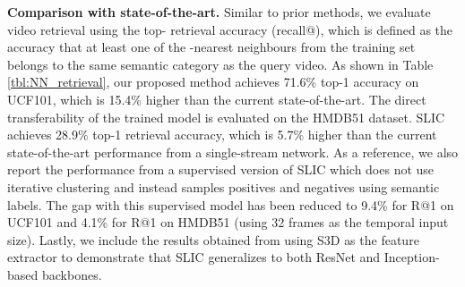 \documentclass[10pt,twocolumn,letterpaper]{article}
\begin{document}
\textbf{Comparison with state-of-the-art.} Similar to prior methods, we evaluate video retrieval using the top- retrieval accuracy (recall@), which is defined as the accuracy that at least one of the -nearest neighbours from the training set belongs to the same semantic category as the query video. As shown in Table \ref{tbl:NN_retrieval}, our proposed method achieves 71.6\% top-1 accuracy on UCF101, which is 15.4\% higher than the current state-of-the-art. The direct transferability of the trained model is evaluated on the HMDB51 dataset. SLIC achieves 28.9\% top-1 retrieval accuracy, which is 5.7\% higher than the current state-of-the-art performance from a single-stream network. As a reference, we also report the performance from a supervised version of SLIC which does not use iterative clustering and instead samples positives and negatives using semantic labels. The gap with this supervised model has been reduced to 9.4\% for R@1 on UCF101 and 4.1\% for R@1 on HMDB51 (using 32 frames as the temporal input size). Lastly, we include the results obtained from using S3D \cite{xie2018rethinking} as the feature extractor to demonstrate that SLIC generalizes to both ResNet and Inception-based backbones. 
\end{document}
